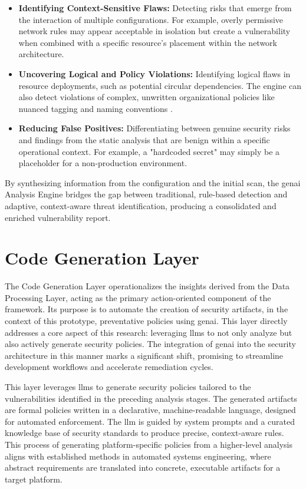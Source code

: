 \begin{itemize}
\item \textbf{Identifying Context-Sensitive Flaws:} Detecting risks that emerge from the interaction of multiple configurations. For example, overly permissive network rules may appear acceptable in isolation but create a vulnerability when combined with a specific resource's placement within the network architecture\cite{zhang_empirical_2024}.
\item \textbf{Uncovering Logical and Policy Violations:} Identifying logical flaws in resource deployments, such as potential circular dependencies. The engine can also detect violations of complex, unwritten organizational policies like nuanced tagging and naming conventions \cite{khanna_enhancing_2024}.
\item \textbf{Reducing False Positives:} Differentiating between genuine security risks and findings from the static analysis that are benign within a specific operational context. For example, a "hardcoded secret" may simply be a placeholder for a non-production environment.
\end{itemize}

By synthesizing information from the configuration and the initial scan, the \gls{genai} Analysis Engine bridges the gap between traditional, rule-based detection and adaptive, context-aware threat identification, producing a consolidated and enriched vulnerability report.


\section{Code Generation Layer}
\label{sec:code-generation-layer}

The Code Generation Layer operationalizes the insights derived from the Data Processing Layer, acting as the primary action-oriented component of the framework. Its purpose is to automate the creation of security artifacts, in the context of this prototype, preventative policies using \gls{genai}. This layer directly addresses a core aspect of this research: leveraging \glspl{llm} to not only analyze but also actively generate security policies. The integration of \gls{genai} into the security architecture in this manner marks a significant shift, promising to streamline development workflows and accelerate remediation cycles.

This layer leverages \glspl{llm} to generate security policies tailored to the vulnerabilities identified in the preceding analysis stages. The generated artifacts are formal policies written in a declarative, machine-readable language, designed for automated enforcement. The \gls{llm} is guided by system prompts and a curated knowledge base of security standards to produce precise, context-aware rules. This process of generating platform-specific policies from a higher-level analysis aligns with established methods in automated systems engineering, where abstract requirements are translated into concrete, executable artifacts for a target platform\cite{fakih_llm4cve_2025}.

